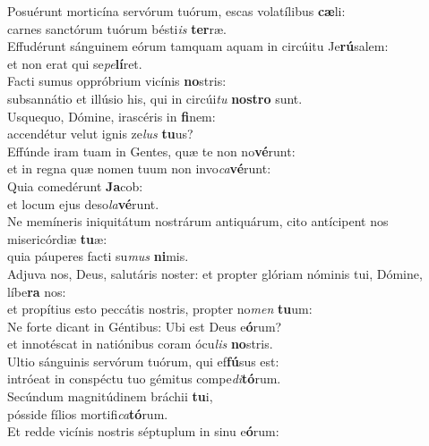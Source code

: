 \evenverse Posuérunt morticína servórum tuórum, escas volatílibus \textbf{cæ}li:~\*\\
\evenverse carnes sanctórum tuórum bésti\textit{is} \textbf{ter}ræ.\\
\oddverse Effudérunt sánguinem eórum tamquam aquam in circúitu Je\textbf{rú}salem:~\*\\
\oddverse et non erat qui se\textit{pe}\textbf{lí}ret.\\
\evenverse Facti sumus oppróbrium vicínis \textbf{no}stris:~\*\\
\evenverse subsannátio et illúsio his, qui in circúi\textit{tu} \textbf{no}\textbf{stro} sunt.\\
\oddverse Usquequo, Dómine, irascéris in \textbf{fi}nem:~\*\\
\oddverse accendétur velut ignis ze\textit{lus} \textbf{tu}us?\\
\evenverse Effúnde iram tuam in Gentes, quæ te non no\textbf{vé}runt:~\*\\
\evenverse et in regna quæ nomen tuum non invo\textit{ca}\textbf{vé}runt:\\
\oddverse Quia comedérunt \textbf{Ja}cob:~\*\\
\oddverse et locum ejus deso\textit{la}\textbf{vé}runt.\\
\evenverse Ne memíneris iniquitátum nostrárum antiquárum, cito antícipent nos misericórdiæ \textbf{tu}æ:~\*\\
\evenverse quia páuperes facti su\textit{mus} \textbf{ni}mis.\\
\oddverse Adjuva nos, Deus, salutáris noster: et propter glóriam nóminis tui, Dómine, líbe\textbf{ra} nos:~\*\\
\oddverse et propítius esto peccátis nostris, propter no\textit{men} \textbf{tu}um:\\
\evenverse Ne forte dicant in Géntibus: Ubi est Deus e\textbf{ó}rum?~\*\\
\evenverse et innotéscat in natiónibus coram ócu\textit{lis} \textbf{no}stris.\\
\oddverse Ultio sánguinis servórum tuórum, qui ef\textbf{fú}sus est:~\*\\
\oddverse intróeat in conspéctu tuo gémitus compe\textit{di}\textbf{tó}rum.\\
\evenverse Secúndum magnitúdinem bráchii \textbf{tu}i,~\*\\
\evenverse pósside fílios mortifi\textit{ca}\textbf{tó}rum.\\
\oddverse Et redde vicínis nostris séptuplum in sinu e\textbf{ó}rum:~\*\\
